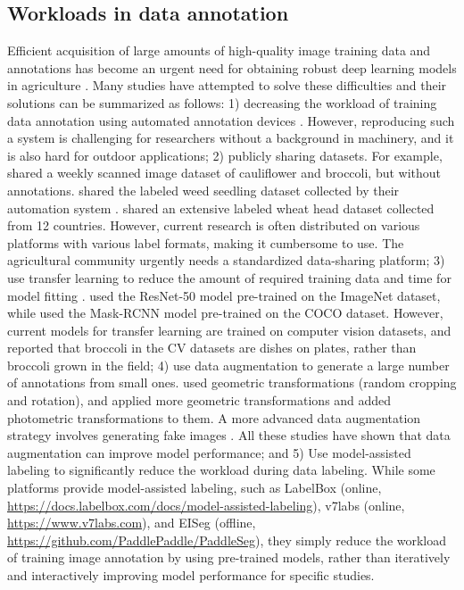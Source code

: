 \subsection{Workloads in data annotation}
Efficient acquisition of large amounts of high-quality image training data and annotations has become an urgent need for obtaining robust deep learning models in agriculture \citep{yang_applications_2021}. Many studies have attempted to solve these difficulties and their solutions can be summarized as follows: 1) decreasing the workload of training data annotation using automated annotation devices \citep{beck_embedded_2020}. However, reproducing such a system is challenging for researchers without a background in machinery, and it is also hard for outdoor applications; 2) publicly sharing datasets. For example, \citet{bender_ladybird_2019} shared a weekly scanned image dataset of cauliflower and broccoli, but without annotations. \citet{beck_weed_2020} shared the labeled weed seedling dataset collected by their automation system \citep{beck_embedded_2020}. \citet{david_global_2021} shared an extensive labeled wheat head dataset collected from 12 countries. However, current research is often distributed on various platforms with various label formats, making it cumbersome to use. The agricultural community urgently needs a standardized data-sharing platform; 3) use transfer learning to reduce the amount of required training data and time for model fitting \citep{yang_applications_2021}. \cite{desai_automatic_2019} used the ResNet-50 model pre-trained on the ImageNet dataset, while \citet{blok_effect_2021} used the Mask-RCNN model pre-trained on the COCO dataset. However, current models for transfer learning are trained on computer vision datasets, and \cite{blok_effect_2021} reported that broccoli in the CV datasets are dishes on plates, rather than broccoli grown in the field; 4) use data augmentation to generate a large number of annotations from small ones. \citet{zhou_monitoring_2020} used geometric transformations (random cropping and rotation), and \citet{blok_effect_2021} applied more geometric transformations and added photometric transformations to them. A more advanced data augmentation strategy involves generating fake images \citep{nesteruk_image_2021}. All these studies have shown that data augmentation can improve model performance; and 5) Use model-assisted labeling to significantly reduce the workload during data labeling. While some platforms provide model-assisted labeling, such as LabelBox (online, \url{https://docs.labelbox.com/docs/model-assisted-labeling}), v7labs (online, \url{https://www.v7labs.com}), and EISeg (offline, \url{https://github.com/PaddlePaddle/PaddleSeg}), they simply reduce the workload of training image annotation by using pre-trained models, rather than iteratively and interactively improving model performance for specific studies.

